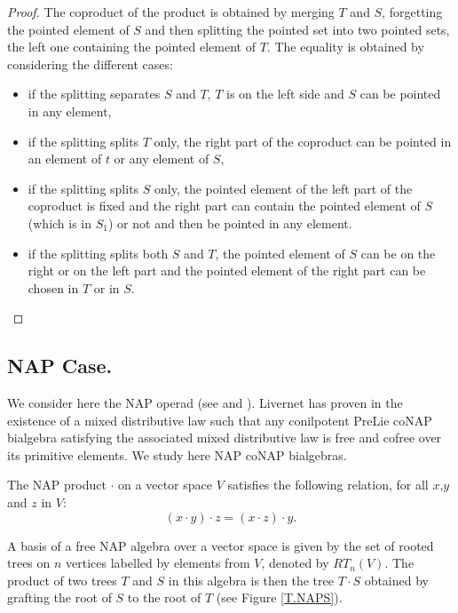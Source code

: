 \documentclass[11pt,leqno]{amsart}
\theoremstyle{definition}
\theoremstyle{plain}
\begin{document}
\begin{proof}
The coproduct of the product is obtained by merging $T$ and $S$, forgetting the pointed element of $S$ and then splitting the pointed set into two pointed sets, the left one containing the pointed element of $T$. The equality is obtained by considering the different cases: 
\begin{itemize}
\item if the splitting separates $S$ and $T$, $T$ is on the left side and $S$ can be pointed in any element, 
\item  if the splitting splits $T$ only, the right part of the coproduct can be pointed in an element of $t$ or any element of $S$, 
\item  if the splitting splits $S$ only, the pointed element of the left part of the coproduct is fixed and the right part can contain the pointed element of $S$ (which is in $S_1$) or not and then be pointed in any element.
\item if the splitting splits both $S$ and $T$, the pointed element of $S$ can be on the right or on the left part and the pointed element of the right part can be chosen in $T$ or in $S$.
\end{itemize}
\end{proof}


\subsection{NAP Case.}

We consider here the NAP operad (see \cite{ChapLiv} and \cite{dzuma}). Livernet has proven in \cite{NAPPL} the existence of a mixed distributive law such that any conilpotent PreLie coNAP bialgebra satisfying the associated mixed distributive law is free and cofree over its primitive elements. We study here NAP coNAP bialgebras.

 The NAP product $\cdot$ on a vector space $V$ satisfies the following relation, for all $x$,$y$ and $z$ in $V$:
\begin{equation*} 
(x \cdot y) \cdot z=(x \cdot z) \cdot y.
\label{NAP rel}
\end{equation*}

A basis of a free NAP algebra over a vector space is given by the set of rooted trees on $n$ vertices labelled by elements from $V$, denoted by $RT_n(V)$. 
The product of two trees $T$ and $S$ in this algebra is then the tree $T \cdot S$ obtained by grafting the root of $S$ to the root of $T$ (see Figure \ref{T.NAPS}).
\end{document}
